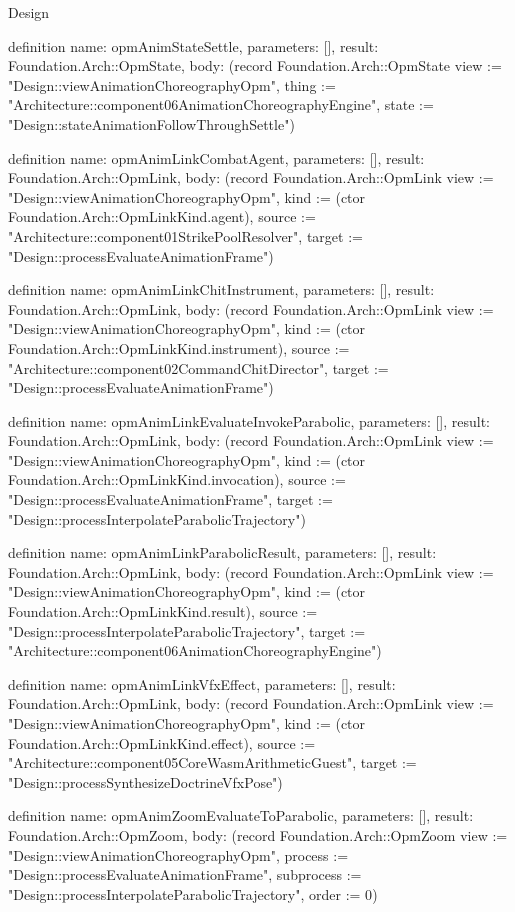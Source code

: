 \begin{lexlean}{Design}
\begin{semanticmodule}
definition{
  name: opmAnimStateSettle,
  parameters: [],
  result: Foundation.Arch::OpmState,
  body: (record Foundation.Arch::OpmState {view := "Design::viewAnimationChoreographyOpm", thing := "Architecture::component06AnimationChoreographyEngine", state := "Design::stateAnimationFollowThroughSettle"})
}

definition{
  name: opmAnimLinkCombatAgent,
  parameters: [],
  result: Foundation.Arch::OpmLink,
  body: (record Foundation.Arch::OpmLink {view := "Design::viewAnimationChoreographyOpm", kind := (ctor Foundation.Arch::OpmLinkKind.agent), source := "Architecture::component01StrikePoolResolver", target := "Design::processEvaluateAnimationFrame"})
}

definition{
  name: opmAnimLinkChitInstrument,
  parameters: [],
  result: Foundation.Arch::OpmLink,
  body: (record Foundation.Arch::OpmLink {view := "Design::viewAnimationChoreographyOpm", kind := (ctor Foundation.Arch::OpmLinkKind.instrument), source := "Architecture::component02CommandChitDirector", target := "Design::processEvaluateAnimationFrame"})
}

definition{
  name: opmAnimLinkEvaluateInvokeParabolic,
  parameters: [],
  result: Foundation.Arch::OpmLink,
  body: (record Foundation.Arch::OpmLink {view := "Design::viewAnimationChoreographyOpm", kind := (ctor Foundation.Arch::OpmLinkKind.invocation), source := "Design::processEvaluateAnimationFrame", target := "Design::processInterpolateParabolicTrajectory"})
}

definition{
  name: opmAnimLinkParabolicResult,
  parameters: [],
  result: Foundation.Arch::OpmLink,
  body: (record Foundation.Arch::OpmLink {view := "Design::viewAnimationChoreographyOpm", kind := (ctor Foundation.Arch::OpmLinkKind.result), source := "Design::processInterpolateParabolicTrajectory", target := "Architecture::component06AnimationChoreographyEngine"})
}

definition{
  name: opmAnimLinkVfxEffect,
  parameters: [],
  result: Foundation.Arch::OpmLink,
  body: (record Foundation.Arch::OpmLink {view := "Design::viewAnimationChoreographyOpm", kind := (ctor Foundation.Arch::OpmLinkKind.effect), source := "Architecture::component05CoreWasmArithmeticGuest", target := "Design::processSynthesizeDoctrineVfxPose"})
}

definition{
  name: opmAnimZoomEvaluateToParabolic,
  parameters: [],
  result: Foundation.Arch::OpmZoom,
  body: (record Foundation.Arch::OpmZoom {view := "Design::viewAnimationChoreographyOpm", process := "Design::processEvaluateAnimationFrame", subprocess := "Design::processInterpolateParabolicTrajectory", order := 0})
}


\end{semanticmodule}
\end{lexlean}
